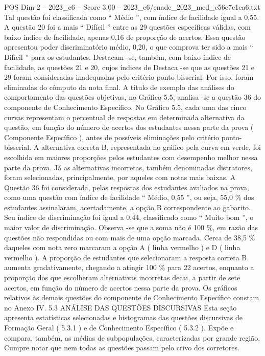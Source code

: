 \begin{textsample}{POS Dim 2 – 2023\_c6 – Score 3.00 – 2023\_c6/enade\_2023\_med\_c56e7c1ea6.txt}
Tal questão foi classificada como “ Médio ”, com índice de facilidade igual a 0,55.
A questão 20 foi a mais “ Difícil ” entre as 29 questões específicas válidas, com baixo índice de facilidade, apenas 0,16 de proporção de acertos.
Essa questão apresentou poder discriminatório médio, 0,20, o que comprova ter sido a mais “ Difícil ” para os estudantes.
Destacam -se, também, com baixo índice de facilidade, as questões 21 e 20, cujos índices de Destaca -se que as questões 21 e 29 foram consideradas inadequadas pelo critério ponto-bisserial.
Por isso, foram eliminadas do cômputo da nota final.
A título de exemplo das análises do comportamento das questões objetivas, no Gráfico 5.5, analisa -se a questão 36 do componente de Conhecimento Específico.
No Gráfico 5.5, cada uma das cinco curvas representam o percentual de respostas em determinada alternativa da questão, em função do número de acertos dos estudantes nessa parte da prova ( Componente Específico ), antes de possíveis eliminações pelo critério ponto-bisserial.
A alternativa correta B, representada no gráfico pela curva em verde, foi escolhida em maiores proporções pelos estudantes com desempenho melhor nessa parte da prova.
Já as alternativas incorretas, também denominadas distratores, foram selecionadas, principalmente, por aqueles com notas mais baixas.
A Questão 36 foi considerada, pelas respostas dos estudantes avaliados na prova, como uma questão com índice de facilidade “ Médio, 0,55 ”, ou seja, 55,0 \% dos estudantes assinalaram, acertadamente, a opção B correspondente ao gabarito.
Seu índice de discriminação foi igual a 0,44, classificado como “ Muito bom ”, o maior valor de discriminação.
Observa -se que a soma não é 100 \%, em razão das questões não respondidas ou com mais de uma opção marcada.
Cerca de 38,5 \% daqueles com nota zero marcaram a opção A ( linha vermelho ) e D ( linha vermelho ).
A proporção de estudantes que selecionaram a resposta correta B aumenta gradativamente, chegando a atingir 100 \% para 22 acertos, enquanto a proporção dos que escolheram alternativas incorretas decai, a partir de sete acertos, em função do número de acertos nessa parte da prova.
Os gráficos relativos às demais questões do componente de Conhecimento Específico constam no Anexo IV. 5.3 ANÁLISE DAS QUESTÕES DISCURSIVAS Esta seção apresenta estatísticas selecionadas e histogramas das questões discursivas de Formação Geral ( 5.3.1 ) e de Conhecimento Específico ( 5.3.2 ).
Expõe e compara, também, as médias de subpopulações, caracterizadas por grande região.
Cumpre notar que nem todas as questões passam pelo crivo dos corretores.

\end{textsample}
